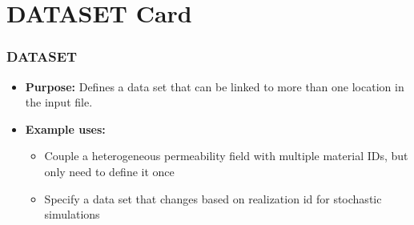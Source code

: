 \section{DATASET Card}

\begin{frame}\frametitle{DATASET}

\begin{itemize}{}
\item[] \textbf{Purpose:} Defines a data set that can be linked to more than one location in the input file.

\item[] \textbf{Example uses:}
\begin{itemize}
\item Couple a heterogeneous permeability field with multiple material IDs, but only need to define it once
\item Specify a data set that changes based on realization id for stochastic simulations
\end{itemize}
\end{itemize}

\end{frame}


